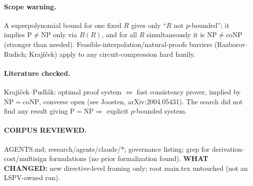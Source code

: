 \documentclass{article}
\begin{document}
\paragraph{Scope warning.} A superpolynomial bound for one fixed $R$ gives only ``$R$ not $p$-bounded''; it implies $\mathrm P\ne\mathrm{NP}$ only via $B(R)$, and for all $R$ simultaneously it is $\mathrm{NP}\ne\mathrm{coNP}$ (stronger than needed). Feasible-interpolation/natural-proofs barriers (Razborov--Rudich; Krajíček) apply to any circuit-compression hard family.

\paragraph{Literature checked.} Krajíček--Pudlák: optimal proof system $\iff$ fast consistency prover, implied by $\mathrm{NP}=\mathrm{coNP}$, converse open (see Joosten, arXiv:2004.05431). The search did not find any result giving $\mathrm P=\mathrm{NP}\Rightarrow$ explicit $p$-bounded system.

\paragraph{CORPUS REVIEWED.} AGENTS.md; research/agents/claude/*; governance listing; grep for derivation-cost/multisign formulations (no prior formalization found). \textbf{WHAT CHANGED:} new directive-level framing only; root main.tex untouched (not an LSPV-owned run).
\end{document}
